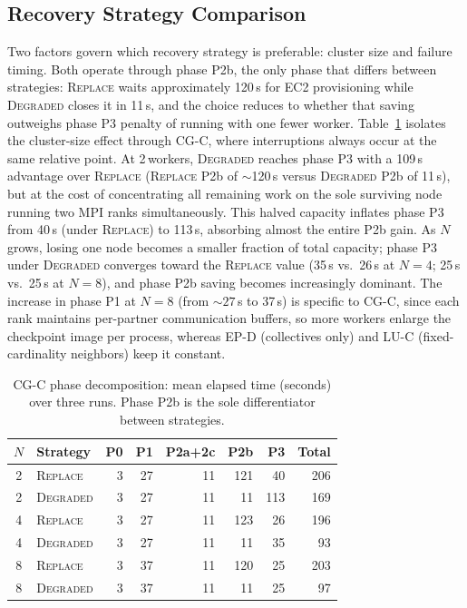 \documentclass[conference]{IEEEtran}
\begin{document}
\subsection{Recovery Strategy Comparison}

Two factors govern which recovery strategy is preferable: cluster size and failure
timing. Both operate through phase P2b, the only phase that differs between strategies:
\textsc{Replace} waits approximately 120\,s for EC2 provisioning while \textsc{Degraded}
closes it in 11\,s, and the choice reduces to whether that saving outweighs phase P3
penalty of running with one fewer worker.
Table~\ref{tab:cg-breakdown} isolates the cluster-size effect through CG-C, where
interruptions always occur at the same relative point.
At 2\,workers, \textsc{Degraded} reaches phase P3 with a 109\,s advantage over
\textsc{Replace} (\textsc{Replace} P2b of $\sim$120\,s versus \textsc{Degraded} P2b
of 11\,s), but at the cost of concentrating all remaining work on the sole surviving
node running two MPI ranks simultaneously. This halved capacity inflates phase P3
from 40\,s (under \textsc{Replace}) to 113\,s, absorbing almost the entire P2b gain.
As $N$ grows, losing one node becomes a smaller fraction of total capacity; phase P3 under
\textsc{Degraded} converges toward the \textsc{Replace} value (35\,s vs.\ 26\,s at
$N{=}4$; 25\,s vs.\ 25\,s at $N{=}8$), and phase P2b saving becomes increasingly
dominant.
The increase in phase P1 at $N{=}8$ (from ${\sim}27$\,s to 37\,s) is specific to CG-C, since each rank maintains per-partner communication buffers, so more workers enlarge the checkpoint image per process, whereas EP-D (collectives only) and LU-C (fixed-cardinality neighbors) keep it constant.

\begin{table}[t]
    \caption{CG-C phase decomposition: mean elapsed time (seconds) over three runs.
             Phase P2b is the sole differentiator between strategies.}
    \label{tab:cg-breakdown}
    \centering
    \small
    \begin{tabular}{clrrrrrr}
        \toprule
        \textbf{$N$} & \textbf{Strategy} & \textbf{P0} & \textbf{P1} & \textbf{P2a+2c} & \textbf{P2b} & \textbf{P3} & \textbf{Total} \\
        \midrule
        2 & \textsc{Replace}  & 3 & 27 & 11 & 121 &  40 & 206 \\
        2 & \textsc{Degraded} & 3 & 27 & 11 &  11 & 113 & 169 \\
        \midrule
        4 & \textsc{Replace}  & 3 & 27 & 11 & 123 & 26 & 196 \\
        4 & \textsc{Degraded} & 3 & 27 & 11 &  11 & 35 &  93 \\
        \midrule
        8 & \textsc{Replace}  & 3 & 37 & 11 & 120 & 25 & 203 \\
        8 & \textsc{Degraded} & 3 & 37 & 11 &  11 & 25 &  97 \\
        \bottomrule
    \end{tabular}
\end{table}
\end{document}
